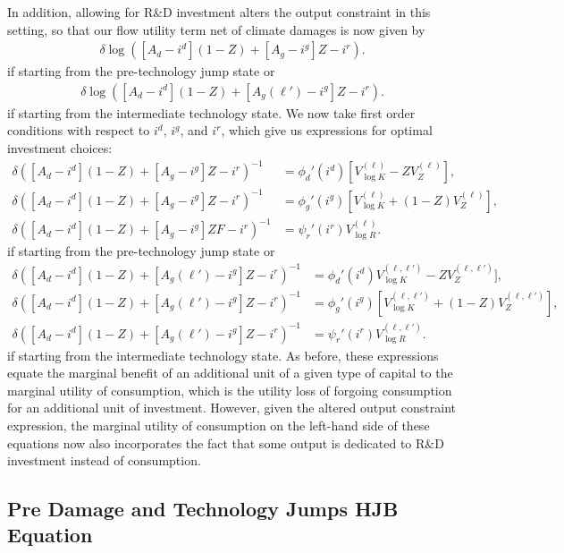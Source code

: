 \documentclass[12pt]{article}
\begin{document}
\begin{appendices}
In addition, allowing for R\&D investment alters the output constraint in this setting, so that our flow utility term net of climate damages is now given by 
\begin{align*}
\delta \log ([A_{d}-i^{d}](1-Z)+[A_{g}-i^{g}]Z - i^{r}).
\end{align*}
if starting from the pre-technology jump state or
\begin{align*}
\delta \log ([A_{d}-i^{d}](1-Z)+[A_{g}(\ell')-i^{g}]Z - i^{r}).
\end{align*}
if starting from the intermediate technology state. We now take first order conditions with respect to $i^d$, $i^g$, and $i^{r}$, which give us expressions for optimal investment choices:
\begin{align*}
\delta([A_{d}-i^{d}](1-Z)+[A_{g}-i^{g}]Z- i^{r})^{-1}	& = \phi_d'(i^{d})[V^{(\ell)}_{\log K}-ZV^{(\ell)}_{Z}], \\
\delta([A_{d}-i^{d}](1-Z)+[A_{g}-i^{g}]Z- i^{r})^{-1}	 & = \phi_g'(i^{g})[V^{(\ell)}_{\log K}+(1-Z)V^{(\ell)}_{Z}], \\
\delta([A_{d}-i^{d}](1-Z)+[A_{g}-i^{g}]ZF- i^{r})^{-1}	 & = \psi_{r}'(i^{r}) V^{(\ell)}_{\log R}. 
\end{align*}
if starting from the pre-technology jump state or
\begin{align*}
\delta([A_{d}-i^{d}](1-Z)+[A_{g}(\ell')-i^{g}]Z- i^{r})^{-1}	& = \phi_d'(i^{d})V^{(\ell,\ell')}_{\log K}-ZV^{(\ell,\ell')}_{Z}], \\
\delta([A_{d}-i^{d}](1-Z)+[A_{g}(\ell')-i^{g}]Z- i^{r})^{-1}	 & = \phi_g'(i^{g})[V^{(\ell,\ell')}_{\log K}+(1-Z)V^{(\ell,\ell')}_{Z}], \\
\delta([A_{d}-i^{d}](1-Z)+[A_{g}(\ell')-i^{g}]Z- i^{r})^{-1}	 & = \psi_{r}'(i^{r}) V^{(\ell,\ell')}_{\log R}. 
\end{align*}
if starting from the intermediate technology state. As before, these expressions equate the marginal benefit of an additional unit of a given type of capital to the marginal utility of consumption, which is the utility loss of forgoing consumption for an additional unit of investment. However, given the altered output constraint expression, the marginal utility of consumption on the left-hand side of these equations now also incorporates the fact that some output is dedicated to R\&D investment instead of consumption.

\subsection{Pre Damage and Technology Jumps HJB Equation}


\end{appendices}
\end{document}
